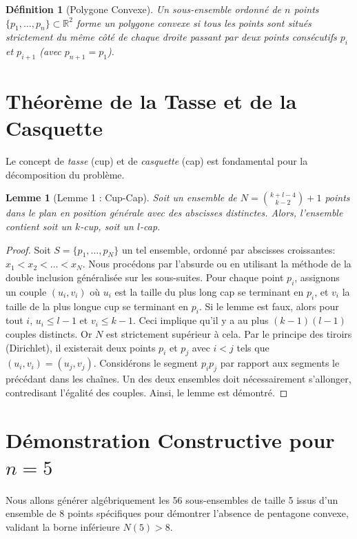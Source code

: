 \documentclass[11pt]{article}
\newtheorem{lemma}{Lemme}[theorem]
\newtheorem{definition}{Définition}
\begin{document}
\begin{definition}[Polygone Convexe]
Un sous-ensemble ordonné de $n$ points $\{p_1, \dots, p_n\} \subset \mathbb{R}^2$ forme un polygone convexe si tous les points sont situés strictement du même côté de chaque droite passant par deux points consécutifs $p_i$ et $p_{i+1}$ (avec $p_{n+1} = p_1$).
\end{definition}

\section{Théorème de la Tasse et de la Casquette}
Le concept de \textit{tasse} (cup) et de \textit{casquette} (cap) est fondamental pour la décomposition du problème.

\begin{lemma}[Lemme 1 : Cup-Cap]
Soit un ensemble de $N = \binom{k+l-4}{k-2} + 1$ points dans le plan en position générale avec des abscisses distinctes. Alors, l'ensemble contient soit un $k$-cup, soit un $l$-cap.
\end{lemma}

\begin{proof}
Soit $S = \{p_1, \dots, p_N\}$ un tel ensemble, ordonné par abscisses croissantes: $x_1 < x_2 < \dots < x_N$.
Nous procédons par l'absurde ou en utilisant la méthode de la double inclusion généralisée sur les sous-suites.
Pour chaque point $p_i$, assignons un couple $(u_i, v_i)$ où $u_i$ est la taille du plus long cap se terminant en $p_i$, et $v_i$ la taille de la plus longue cup se terminant en $p_i$.
Si le lemme est faux, alors pour tout $i$, $u_i \le l-1$ et $v_i \le k-1$.
Ceci implique qu'il y a au plus $(k-1)(l-1)$ couples distincts.
Or $N$ est strictement supérieur à cela. Par le principe des tiroirs (Dirichlet), il existerait deux points $p_i$ et $p_j$ avec $i < j$ tels que $(u_i, v_i) = (u_j, v_j)$.
Considérons le segment $p_i p_j$ par rapport aux segments le précédant dans les chaînes. Un des deux ensembles doit nécessairement s'allonger, contredisant l'égalité des couples. Ainsi, le lemme est démontré.
\end{proof}

\section{Démonstration Constructive pour $n=5$}
Nous allons générer algébriquement les 56 sous-ensembles de taille 5 issus d'un ensemble de 8 points spécifiques pour démontrer l'absence de pentagone convexe, validant la borne inférieure $N(5) > 8$.
\end{document}
